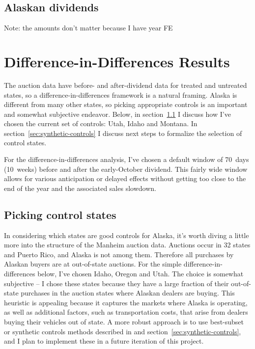 \documentclass[11pt,letterpaper,oneside]{article}
\begin{document}
\begin{doublespacing}
\subsection{Alaskan dividends}
Note: the amounts don't matter because I have year FE



\section[DD Results]{Difference-in-Differences Results}

The auction data have before- and after\hyp{}dividend data for treated and untreated states, so a difference\hyp{}in\hyp{}differences framework is a natural framing.
Alaska is different from many other states, so picking appropriate controls is an important and somewhat subjective endeavor.
Below, in section~\ref{sec:picking-controls} I discuss how I've chosen the current set of controls: Utah, Idaho and Montana.
In section~\ref{sec:synthetic-controls} I discuss next steps to formalize the selection of control states.

For the difference\hyp{}in\hyp{}differences analysis, I've chosen a default window of 70~days (10~weeks) before and after the early\hyp{}October dividend.
This fairly wide window allows for various anticipation or delayed effects without getting too close to the end of the year and the associated sales slowdown.


\subsection{Picking control states}
\label{sec:picking-controls}
In considering which states are good controls for Alaska, it's worth diving a little more into the structure of the Manheim auction data.
Auctions occur in 32 states and Puerto Rico, and Alaska is not among them.
Therefore all purchases by Alaskan buyers are at out\hyp{}of\hyp{}state auctions.
For the simple difference\hyp{}in\hyp{}differences below, I've chosen Idaho, Oregon and Utah.
The choice is somewhat subjective -- I chose these states because they have a large fraction of their out\hyp{}of\hyp{}state purchases in the auction states where Alaskan dealers are buying.
This heuristic is appealing because it captures the markets where Alaska is operating, as well as additional factors, such as transportation costs, that arise from dealers buying their vehicles out of state.
A more robust approach is to use best\hyp{}subset or synthetic controls methods described in \textcite{DoudchenkoImbens2016DD} and section~\ref{sec:synthetic-controls}, and I plan to implement these in a future iteration of this project.


\end{doublespacing}
\end{document}
